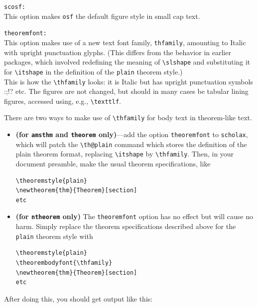 \documentclass[11pt]{article}
\theoremstyle{oldplain}
\theoremstyle{plain}
\begin{document}
{\tt scosf:}\\
This option makes {\tt osf} the default figure style in small cap text. 

{\tt theoremfont:}\\
This option makes use of a new text font family, {\tt thfamily}, amounting to Italic with upright punctuation glyphs. 
(This differs from the behavior in earlier packages, which involved redefining  the meaning of \verb|\slshape| and substituting it for \verb|\itshape| in the definition of the {\tt plain} theorem style.)\\
{\thfamily This is how the \verb|\thfamily|  looks: it is Italic but has upright punctuation symbols :;!? etc. The figures are not changed, but should in many cases be tabular lining figures, accessed using, e.g.,\/} \verb|\texttlf|.

There are two ways to make use of \verb|\thfamily| for body text in theorem-like text.
\begin{itemize}
\item
\textbf{(for {\tt amsthm} and {\tt theorem} only)}---add the option {\tt theoremfont} to {\tt scholax}, which will patch the \verb|\th@plain| command which stores the definition of the plain theorem format, replacing \verb|\itshape| by \verb|\thfamily|. Then, in your document preamble, make the usual theorem specifications, like
\begin{verbatim}
\theoremstyle{plain}
\newtheorem{thm}{Theorem}[section]
etc
\end{verbatim}
\item
\textbf{(for {\tt ntheorem} only)} The {\tt theoremfont} option has no effect but will cause no harm. 
Simply replace the theorem specifications described above for the {\tt plain} theorem style with
\begin{verbatim}
\theoremstyle{plain}
\theorembodyfont{\thfamily}
\newtheorem{thm}{Theorem}[section]
etc
\end{verbatim}
\end{itemize}

After doing this, you should get output like  this:
\end{document}
